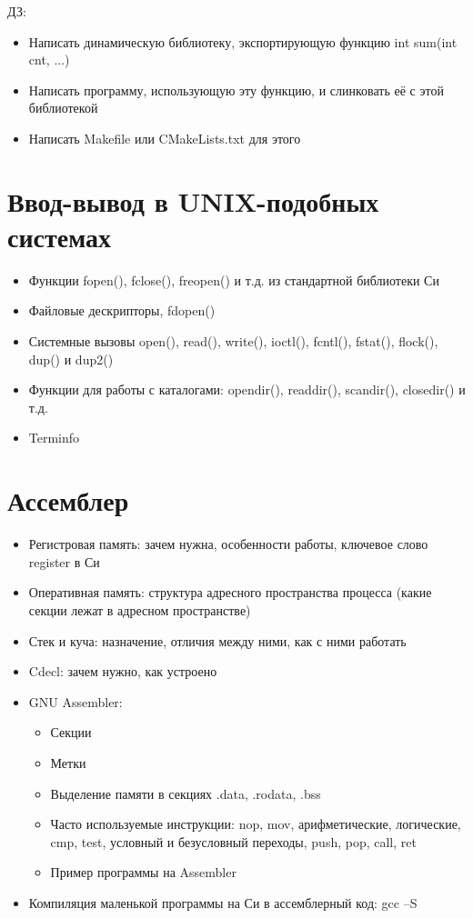\documentclass{article}
\begin{document}
    ДЗ:
    \begin{itemize}
        \item Написать динамическую библиотеку, экспортирующую функцию int sum(int cnt, ...)
        \item Написать программу, использующую эту функцию, и слинковать её с этой библиотекой
        \item Написать Makefile или CMakeLists.txt для этого
    \end{itemize}

\section{Ввод-вывод в UNIX-подобных системах}

\begin{itemize}
    \item Функции fopen(), fclose(), freopen() и т.д. из стандартной библиотеки Си
    \item Файловые дескрипторы, fdopen()
    \item Системные вызовы open(), read(), write(), ioctl(), fcntl(), fstat(), flock(), dup() и dup2()
    \item Функции для работы с каталогами: opendir(), readdir(), scandir(), closedir() и т.д.
    \item Terminfo
\end{itemize}

\section{Ассемблер}

    \begin{itemize}
        \item Регистровая память: зачем нужна, особенности работы, ключевое слово register в Си
        \item Оперативная память: структура адресного пространства процесса (какие секции лежат в адресном пространстве)
        \item Стек и куча: назначение, отличия между ними, как с ними работать
        \item Cdecl: зачем нужно, как устроено
        \item GNU Assembler:
        \begin{itemize}
            \item Секции
            \item Метки
            \item Выделение памяти в секциях .data, .rodata, .bss
            \item Часто используемые инструкции: nop, mov, арифметические, логические, cmp, test, условный и безусловный переходы, push, pop, call, ret
            \item Пример программы на Assembler
        \end{itemize}
        \item Компиляция маленькой программы на Си в ассемблерный код: gcc --S
    \end{itemize}
\end{document}

